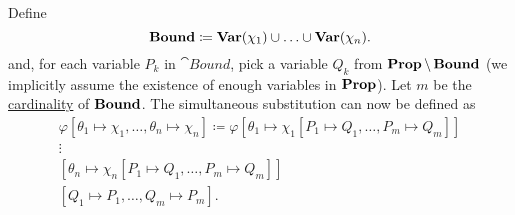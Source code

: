 \begin{definition}
\begin{thmenum}
    Define
    \begin{equation*}
      \operatorname{\mathbf{Bound}} \coloneqq \operatorname{\mathbf{Var}}(\chi_1) \cup \ldots \cup \operatorname{\mathbf{Var}}(\chi_n).
    \end{equation*}
    and, for each variable \( P_k \) in \( \cat{Bound} \), pick a variable \( Q_k \) from \( \operatorname{\mathbf{Prop}} \setminus \operatorname{\mathbf{Bound}} \) (we implicitly assume the existence of enough variables in \( \operatorname{\mathbf{Prop}} \)). Let \( m \) be the \hyperref[def:cardinal]{cardinality} of \( \operatorname{\mathbf{Bound}} \). The simultaneous substitution can now be defined as
    \begin{align*}
      \varphi[\theta_1 \mapsto \chi_1, \ldots, \theta_n \mapsto \chi_n] \coloneqq \varphi
      [\theta_1 \mapsto \chi_1[P_1 \mapsto Q_1, \ldots, P_m \mapsto Q_m]] \\
      \vdots \hspace{3cm} \\
      [\theta_n \mapsto \chi_n[P_1 \mapsto Q_1, \ldots, P_m \mapsto Q_m]] \\
      [Q_1 \mapsto P_1, \ldots, Q_m \mapsto P_m].
    \end{align*}
  \end{thmenum}
\end{definition}

